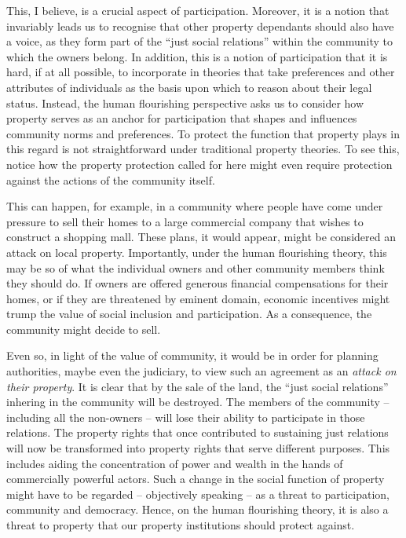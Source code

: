 This, I believe, is a crucial aspect of participation. Moreover, it is a notion that invariably leads us to recognise that other property dependants should also have a voice, as they form part of the ``just social relations'' within the community to which the owners belong. In addition, this is a notion of participation that it is hard, if at all possible, to incorporate in theories that take preferences and other attributes of individuals as the basis upon which to reason about their legal status. Instead, the human flourishing perspective asks us to consider how property serves as an anchor for participation that shapes and influences community norms and preferences. To protect the function that property plays in this regard is not straightforward under traditional property theories. To see this, notice how the property protection called for here might even require protection against the actions of the community itself.

This can happen, for example, in a community where people have come under pressure to sell their homes to a large commercial company that wishes to construct a shopping mall. These plans, it would appear, might be considered an attack on local property. Importantly, under the human flourishing theory, this may be so  of what the individual owners and other community members think they should do. If owners are offered generous financial compensations for their homes, or if they are threatened by eminent domain, economic incentives might trump the value of social inclusion and participation. As a consequence, the community might decide to sell. 

Even so, in light of the value of community, it would be in order for planning authorities, maybe even the judiciary, to view such an agreement as an {\it attack on their property}. It is clear that by the sale of the land, the ``just social relations'' inhering in the community will be destroyed. The members of the community -- including all the non-owners -- will lose their ability to participate in those relations. The property rights that once contributed to sustaining just relations will now be transformed into property rights that serve different purposes. This includes aiding the concentration of power and wealth in the hands of commercially powerful actors. Such a change in the social function of property might have to be regarded -- objectively speaking -- as a threat to participation, community and democracy. Hence, on the human flourishing theory, it is also a threat to property that our property institutions should protect against.

